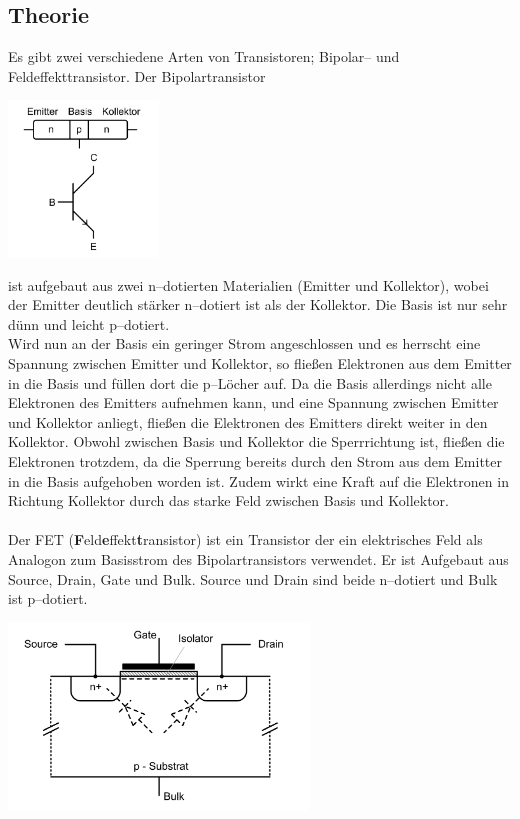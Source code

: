 \documentclass[10pt]{article}
\newenvironment{Figure}
  {\par\medskip\noindent\minipage{\linewidth}}
  {\endminipage\par\medskip}
\begin{document}
\begin{multicols}{2}
	\section{Theorie}
	Es gibt zwei verschiedene Arten von Transistoren; Bipolar-- und Feldeffekttransistor.
	Der Bipolartransistor
	\begin{Figure}
		\centering
		\includegraphics[width=0.3\textwidth]{bipolartransistor.png}
	\end{Figure}
	ist aufgebaut aus zwei n--dotierten Materialien (Emitter und Kollektor), wobei der Emitter deutlich stärker n--dotiert ist als der Kollektor.
	Die Basis ist nur sehr dünn und leicht p--dotiert.
	\\\indent Wird nun an der Basis ein geringer Strom angeschlossen und es herrscht eine Spannung zwischen Emitter und Kollektor, so fließen Elektronen aus dem Emitter in die Basis und füllen dort die p--Löcher auf.
	Da die Basis allerdings nicht alle Elektronen des Emitters aufnehmen kann, und eine Spannung zwischen Emitter und Kollektor anliegt, fließen die Elektronen des Emitters direkt weiter in den Kollektor.
	Obwohl zwischen Basis und Kollektor die Sperrrichtung ist, fließen die Elektronen trotzdem, da die Sperrung bereits durch den Strom aus dem Emitter in die Basis aufgehoben worden ist.
	Zudem wirkt eine Kraft auf die Elektronen in Richtung Kollektor durch das starke Feld zwischen Basis und Kollektor.
	\\\\ Der FET (\textbf{F}eld\textbf{e}ffekt\textbf{t}ransistor) ist ein Transistor der ein elektrisches Feld als Analogon zum Basisstrom des Bipolartransistors verwendet.
	Er ist Aufgebaut aus Source, Drain, Gate und Bulk.
	Source und Drain sind beide n--dotiert und Bulk ist p--dotiert.
	\begin{Figure}
		\centering
		\includegraphics[width=0.6\textwidth]{fet.png}

\end{Figure}
\end{multicols}
\end{document}

